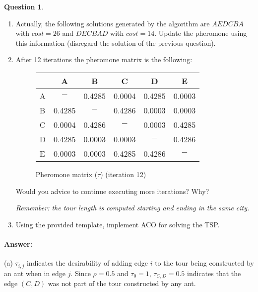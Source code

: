 \documentclass[11pt,a4paper]{article}
\theoremstyle{definition}%
\newtheorem{Q}{Question}[] %
\newcommand{\reponse}[1]{%
\ifthenelse {\boolean{corrige}} {\paragraph{Answer:} \color{darkblue}   #1\color{black}} {}
}
\begin{document}
\begin{Q}
\begin{enumerate}
 \item Actually, the following solutions generated by the algorithm are $AEDCBA$ with $cost=26$ and $DECBAD$ with $cost=14$. Update the pheromone using this information (disregard the solution of the previous question).
     \item After 12 iterations the pheromone matrix is the following:
        \begin{figure}[ht]
           \centering
           \begin{tabular} {| l | c |c | c | c | c |}
            \hline
                &  A  &  B  &  C  &  D  & E   \\
            \hline
              A & $-$     &  0.4285  &  0.0004  &  0.4285  & 0.0003   \\
              B &  0.4285 & $-$      &  0.4286  &  0.0003  & 0.0003  \\  
              C &  0.0004 &  0.4286  & $-$      &  0.0003  & 0.4285   \\
              D &  0.4285 &  0.0003  &  0.0003  & $-$      & 0.4286   \\
              E &  0.0003 &  0.0003  &  0.4285  &  0.4286  & $-$  \\
            \hline
            \end{tabular}
            \caption{Pheromone matrix ($\tau$) (iteration 12)}
        \end{figure}
         
         Would you advice to continue executing more iterations? Why?

 \textit{Remember: the tour length is computed starting and ending in the same city.}
 
\item Using the provided template, implement ACO for solving the TSP.

 \end{enumerate}

 \reponse{
    (a) $\tau_{i,j}$ indicates the desirability of adding edge $i$ to the tour being constructed 
    by an ant when in edge $j$. Since $\rho=0.5$ and $\tau_0=1$, $\tau_{C,D}=0.5$ indicates that 
    the edge $(C,D)$ was not part of the tour constructed by any ant.

}
\end{Q}
\end{document}
